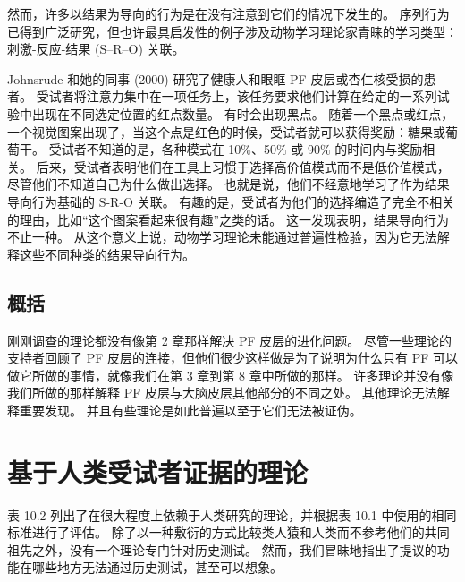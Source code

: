\par 
然而，许多以结果为导向的行为是在没有注意到它们的情况下发生的。 序列行为已得到广泛研究，但也许最具启发性的例子涉及动物学习理论家青睐的学习类型：刺激-反应-结果 (S–R–O) 关联。
\par 
Johnsrude 和她的同事 (2000) 研究了健康人和眼眶 PF 皮层或杏仁核受损的患者。 受试者将注意力集中在一项任务上，该任务要求他们计算在给定的一系列试验中出现在不同选定位置的红点数量。 有时会出现黑点。 随着一个黑点或红点，一个视觉图案出现了，当这个点是红色的时候，受试者就可以获得奖励：糖果或葡萄干。 受试者不知道的是，各种模式在 10$\%$、50$\%$ 或 90$\%$ 的时间内与奖励相关。 后来，受试者表明他们在工具上习惯于选择高价值模式而不是低价值模式，尽管他们不知道自己为什么做出选择。 也就是说，他们不经意地学习了作为结果导向行为基础的 S-R-O 关联。 有趣的是，受试者为他们的选择编造了完全不相关的理由，比如“这个图案看起来很有趣”之类的话。 这一发现表明，结果导向行为不止一种。 从这个意义上说，动物学习理论未能通过普遍性检验，因为它无法解释这些不同种类的结果导向行为。
\subsection{概括}
刚刚调查的理论都没有像第 2 章那样解决 PF 皮层的进化问题。 尽管一些理论的支持者回顾了 PF 皮层的连接，但他们很少这样做是为了说明为什么只有 PF 可以做它所做的事情，就像我们在第 3 章到第 8 章中所做的那样。 许多理论并没有像我们所做的那样解释 PF 皮层与大脑皮层其他部分的不同之处。 其他理论无法解释重要发现。 并且有些理论是如此普遍以至于它们无法被证伪。
\section{基于人类受试者证据的理论}
表 10.2 列出了在很大程度上依赖于人类研究的理论，并根据表 10.1 中使用的相同标准进行了评估。 除了以一种敷衍的方式比较类人猿和人类而不参考他们的共同祖先之外，没有一个理论专门针对历史测试。 然而，我们冒昧地指出了提议的功能在哪些地方无法通过历史测试，甚至可以想象。
